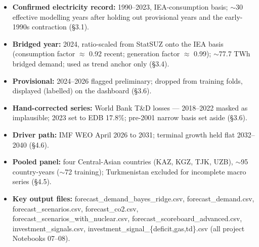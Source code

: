 \documentclass[10pt,twocolumn]{article}
\begin{document}
\begin{itemize}[leftmargin=1.2em,itemsep=1pt,topsep=2pt]

\item \textbf{Confirmed electricity record:} 1990--2023, IEA-consumption basis; $\sim$30 effective modelling years after holding out provisional years and the early-1990s contraction (\S{}3.1).

\item \textbf{Bridged year:} 2024, ratio-scaled from StatSUZ onto the IEA basis (consumption factor $\approx$ 0.92 recent; generation factor $\approx$ 0.99); $\sim$77.7 TWh bridged demand; used as trend anchor only (\S{}3.4).

\item \textbf{Provisional:} 2024--2026 flagged preliminary; dropped from training folds, displayed (labelled) on the dashboard (\S{}3.6).

\item \textbf{Hand-corrected series:} World Bank T\&D losses --- 2018--2022 masked as implausible; 2023 set to EDB 17.8\%; pre-2001 narrow basis set aside (\S{}3.6).

\item \textbf{Driver path:} IMF WEO April 2026 to 2031; terminal growth held flat 2032--2040 (\S{}4.6).

\item \textbf{Pooled panel:} four Central-Asian countries (KAZ, KGZ, TJK, UZB), $\sim$95 country-years ($\sim$72 training); Turkmenistan excluded for incomplete macro series (\S{}4.5).

\item \textbf{Key output files:} forecast\_demand\_bayes\_ridge.csv, forecast\_demand.csv, forecast\_scenarios.csv, forecast\_co2.csv, forecast\_scenarios\_with\_nuclear.csv, forecast\_scoreboard\_advanced.csv, investment\_signals.csv, investment\_signal\_\{deficit,gas,td\}.csv (all project Notebooks 07--08).

\end{itemize}
\end{document}

